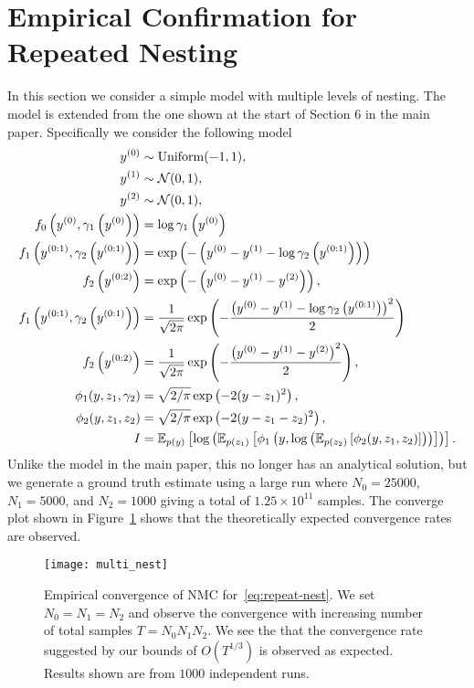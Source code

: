 
\section{Empirical Confirmation for Repeated Nesting}
\label{sec:exp-repeat-app}

In this section we consider a simple model with multiple levels of nesting.  The model is extended from
the one shown at the start of Section 6 in the main paper.  Specifically we consider the following model
\begin{align}
	\begin{split}
\label{eq:repeat-nest}
y^{(0)} &\sim \mathrm{Uniform}(-1,1), \\
y^{(1)} &\sim \mathcal{N}(0,1), \\
y^{(2)} &\sim \mathcal{N}(0,1), \\
f_0 \left(y^{(0)}, \gamma_1\left(y^{(0)}\right)\right)&= \log \gamma_1\left(y^{(0)}\right)\\
f_1 \left(y^{(0:1)}, \gamma_2\left(y^{(0:1)}\right)\right)&= 
\exp\left(-\left(y^{(0)}-y^{(1)}-\log \gamma_2\left(y^{(0:1)}\right)\right)\right)\\
f_2 \left(y^{(0:2)}\right)&=\exp\left(-\left(y^{(0)}-y^{(1)}-y^{(2)}\right)\right),\\
f_1 \left(y^{(0:1)}, \gamma_2\left(y^{(0:1)}\right)\right)&= 
	\frac{1}{\sqrt{2\pi}}\exp\left(-\frac{\left(y^{(0)}-y^{(1)}-\log \gamma_2\left(y^{(0:1)}\right)\right)^2}{2} \right)\\
f_2 \left(y^{(0:2)}\right)&=\frac{1}{\sqrt{2\pi}}\exp\left(-\frac{\left(y^{(0)}-y^{(1)}-y^{(2)}\right)^2}{2}\right),\\
\phi_1(y,z_1,\gamma_2) &= \sqrt{2/\pi}\exp\left(-2(y-z_1)^2\right), \\
\phi_2(y,z_1,z_2) &= \sqrt{2/\pi}\exp\left(-2(y-z_1-z_2)^2\right), \\
I &= \mathbb{E}_{p(y)}\left[\log\left(\mathbb{E}_{p(z_1)}\left[\phi_1\left(y,\log\left(\mathbb{E}_{
	 p(z_2)}\left[\phi_2(y,z_1,z_2)\right]\right)\right)\right]\right)\right].
\end{split}
\end{align}
Unlike the model in the main paper, this no longer has an analytical solution, but we generate a
ground truth estimate using a large run where $N_0 = 25000$, $N_1=5000$, and $N_2=1000$ giving 
a total of $1.25 \times 10^{11}$ samples.  The converge plot shown in Figure~\ref{fig:multi-nest} shows that the
theoretically expected convergence rates are observed.


\begin{figure}[t]
	\centering
	\texttt{[image: multi\_nest]}
	\caption{Empirical convergence of NMC for~\eqref{eq:repeat-nest}.  We set $N_0=N_1 = N_2$ and
		observe the convergence with increasing number of total samples $T=N_0 N_1 N_2$.  We
		see the that the convergence rate suggested by our bounds of $O(T^{1/3})$ is observed as
		expected.  Results shown are from $1000$ independent runs.
		\label{fig:multi-nest}}
\end{figure}	
